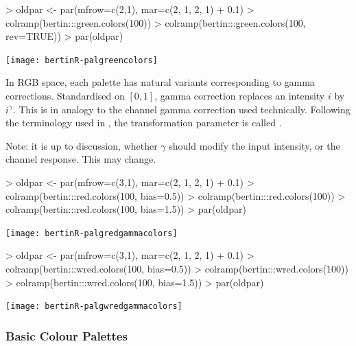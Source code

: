 \documentclass[nogin, dvips,12pt,a4paper,twoside]{amsart}
\begin{document}

\begin{Schunk}
\begin{Sinput}
> oldpar <- par(mfrow=c(2,1), mar=c(2, 1, 2, 1) + 0.1)
> colramp(bertin:::green.colors(100))
> colramp(bertin:::green.colors(100, rev=TRUE))
> par(oldpar)
\end{Sinput}
\end{Schunk}
\texttt{[image: bertinR-palgreencolors]}


\clearpage

In RGB space, each palette has natural variants corresponding to gamma corrections. Standardised on $[0, 1]$, gamma correction replaces an intensity $i$ by $i^\gamma$. This is in analogy to the channel gamma correction used technically. Following the terminology used in \R{}, the transformation parameter is called .

Note: it is up to discussion, whether $\gamma$ should modify the input intensity, or the channel response. This may change.

\begin{Schunk}
\begin{Sinput}
> oldpar <- par(mfrow=c(3,1), mar=c(2, 1, 2, 1) + 0.1)
> colramp(bertin:::red.colors(100, bias=0.5))
> colramp(bertin:::red.colors(100))
> colramp(bertin:::red.colors(100, bias=1.5))
> par(oldpar)
\end{Sinput}
\end{Schunk}
\texttt{[image: bertinR-palgredgammacolors]}


\begin{Schunk}
\begin{Sinput}
> oldpar <- par(mfrow=c(3,1), mar=c(2, 1, 2, 1) + 0.1)
> colramp(bertin:::wred.colors(100, bias=0.5))
> colramp(bertin:::wred.colors(100))
> colramp(bertin:::wred.colors(100, bias=1.5))
> par(oldpar)
\end{Sinput}
\end{Schunk}
\texttt{[image: bertinR-palgwredgammacolors]}

\clearpage

\subsubsection{Basic Colour Palettes}\ 
\end{document}
